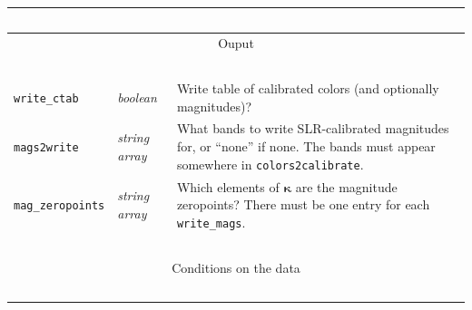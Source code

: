 \documentclass{report}
\newcommand{\zptcolor}{\boldsymbol{\kappa}}
\newcommand{\slr}{SLR}
\begin{document}
\begin{center}
\begin{longtable}{llp{3.5in}}
~ & ~ & ~ \\ \hline
\multicolumn{3}{c}{Ouput} \\
\hline ~ & ~ & ~ \\ 

\verb|write_ctab| & {\it boolean} & Write table of calibrated colors (and optionally magnitudes)? \\
\verb|mags2write| & {\it string array} & What bands to write \slr-calibrated magnitudes for, or ``none'' if none. The bands must appear somewhere in \verb|colors2calibrate|. \\
\verb|mag_zeropoints| & {\it string array} & Which elements of $\zptcolor$ are the magnitude zeropoints?  There must be one entry for each \verb|write_mags|.  \\

~ & ~ & ~ \\ \hline
\multicolumn{3}{c}{Conditions on the data} \\
\hline ~ & ~ & ~ \\ 


\end{longtable}
\end{center}
\end{document}
